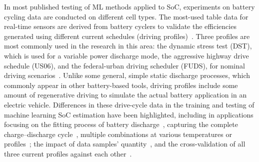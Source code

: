 %
In most published testing of ML methods applied to SoC, experiments on battery cycling data are conducted on different cell types.
The most-used table data for real-time sensors are derived from battery cyclers to validate the efficiencies generated using different current schedules (driving profiles)~\cite{Chemali2017,song_lithium-ion_2018,mamo_long_2020,xiao_accurate_2019}.
Three profiles are most commonly used in the research in this area: the dynamic stress test (DST), which is used for a variable power discharge mode, the aggressive highway drive schedule (US06), and the federal-urban driving scheduler (FUDS), for nominal driving scenarios~\cite{xiao_accurate_2019,javid_adaptive_2020,mamo_long_2020}.
Unlike some general, simple static discharge processes, which commonly appear in other battery-based tools, driving profiles include some amount of regenerative driving to simulate the actual battery application in an electric vehicle.
Differences in these drive-cycle data in the training and testing of machine learning SoC estimation have been highlighted, including in applications focusing on the fitting process of battery discharge~\cite{song_lithium-ion_2018,mamo_long_2020,jiao_gru-rnn_2020,javid_adaptive_2020}, capturing the complete charge--discharge cycle~\cite{Chemali2017}, multiple combinations at various temperatures or profiles~\cite{xiao_accurate_2019,mamo_long_2020,Chemali2017,javid_adaptive_2020}; the impact of data samples' quantity~\cite{song_lithium-ion_2018}, and the cross-validation of all three current profiles against each other~\cite{mamo_long_2020}.
%
